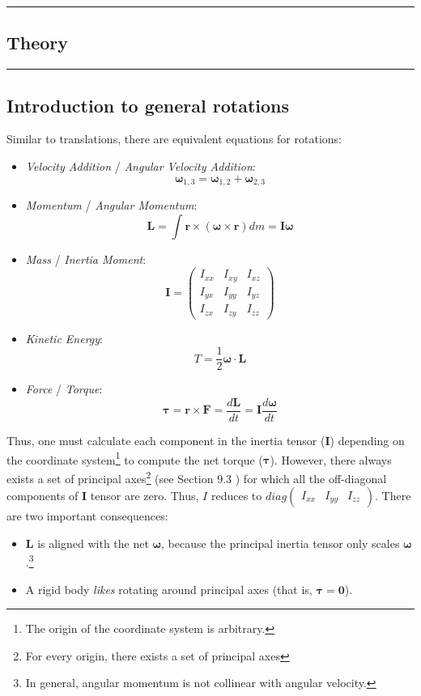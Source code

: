 {\color{gray}\hrule}
\begin{center}
\section{Theory}
\bigskip
\end{center}
{\color{gray}\hrule}

\begin{multicols}{2}
\subsection{Introduction to general rotations}
\label{sec:theory:introduction}

Similar to translations, there are equivalent equations for rotations:
\begin{itemize}
\item \emph{Velocity Addition} / \emph{Angular Velocity Addition}: $$\boldsymbol\omega_{1,3} = \boldsymbol\omega_{1,2} + \boldsymbol\omega_{2,3}$$
\item \emph{Momentum} / \emph{Angular Momentum}: $$\mathbf{L} = \int \mathbf{r} \times (\boldsymbol\omega \times \mathbf{r}) dm = \mathbf{I} \boldsymbol\omega$$
\item \emph{Mass} / \emph{Inertia Moment}: $$\mathbf{I} = \begin{pmatrix} I_{xx} & I_{xy} & I_{xz} \\ I_{yx} & I_{yy} & I_{yz} \\ I_{zx} & I_{zy} & I_{zz} \end{pmatrix}$$
\item \emph{Kinetic Energy}: $$T = \frac{1}{2} \boldsymbol\omega \cdot \mathbf{L} $$
\item \emph{Force} / \emph{Torque}: $$\boldsymbol\tau = \mathbf{r} \times \mathbf{F} = \frac{d\mathbf{L}}{dt} = \mathbf{I}\frac{d\boldsymbol\omega}{dt}$$
\end{itemize}

Thus, one must calculate each component in the inertia tensor ($\mathbf{I}$) depending on the coordinate system\footnote{The origin of the coordinate system is arbitrary.} to compute the net torque ($\boldsymbol{\tau}$). However, there always exists a set of principal axes\footnote{For every origin, there exists a set of principal axes} (see Section 9.3 \cite{morin}) for which all the off-diagonal components of $\mathbf{I}$ tensor are zero. Thus, $I$ reduces to $diag \begin{pmatrix} I_{xx} & I_{yy} & I_{zz} \end{pmatrix}$. There are two important consequences:
\begin{itemize}
\item $\mathbf{L}$ is aligned with the net $\boldsymbol\omega$, because the principal inertia tensor only scales $\boldsymbol\omega$.\footnote{In general, angular momentum is not collinear with angular velocity.}
\item A rigid body \emph{likes} rotating around principal axes (that is, $\boldsymbol\tau = \mathbf{0}$).
\end{itemize}


\end{multicols}
